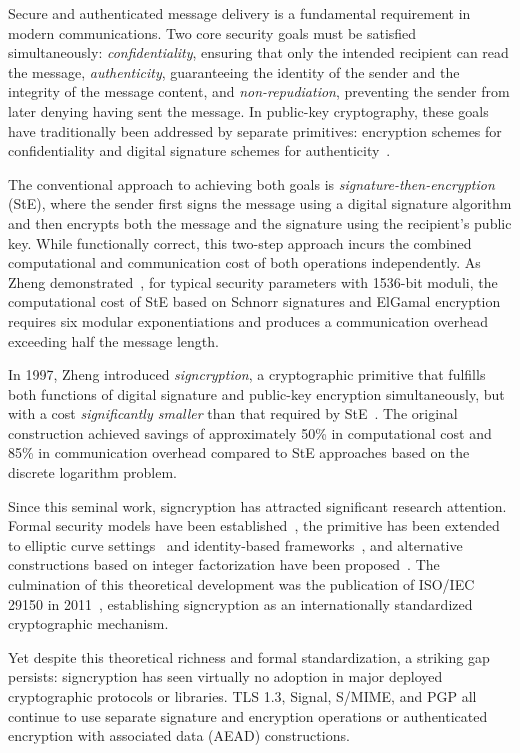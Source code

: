 \documentclass[conference]{IEEEtran}
\begin{document}
Secure and authenticated message delivery is a fundamental requirement in modern communications. Two core security goals must be satisfied simultaneously: \textit{confidentiality}, ensuring that only the intended recipient can read the message, \textit{authenticity}, guaranteeing the identity of the sender and the integrity of the message content, and \textit{non-repudiation}, preventing the sender from later denying having sent the message. In public-key cryptography, these goals have traditionally been addressed by separate primitives: encryption schemes for confidentiality and digital signature schemes for authenticity~\cite{zheng1997}.

The conventional approach to achieving both goals is \textit{signature-then-encryption} (StE), where the sender first signs the message using a digital signature algorithm and then encrypts both the message and the signature using the recipient's public key. While functionally correct, this two-step approach incurs the combined computational and communication cost of both operations independently. As Zheng demonstrated~\cite{zheng1997}, for typical security parameters with 1536-bit moduli, the computational cost of StE based on Schnorr signatures and ElGamal encryption requires six modular exponentiations and produces a communication overhead exceeding half the message length.

In 1997, Zheng introduced \textit{signcryption}, a cryptographic primitive that fulfills both functions of digital signature and public-key encryption simultaneously, but with a cost \textit{significantly smaller} than that required by StE~\cite{zheng1997}. The original construction achieved savings of approximately 50\% in computational cost and 85\% in communication overhead compared to StE approaches based on the discrete logarithm problem.

Since this seminal work, signcryption has attracted significant research attention. Formal security models have been established~\cite{baek2002, an2002, baek2007}, the primitive has been extended to elliptic curve settings~\cite{zheng1998} and identity-based frameworks~\cite{malonelee2002, boyen2003}, and alternative constructions based on integer factorization have been proposed~\cite{steinfeld2000}. The culmination of this theoretical development was the publication of ISO/IEC 29150 in 2011~\cite{iso29150}, establishing signcryption as an internationally standardized cryptographic mechanism.

Yet despite this theoretical richness and formal standardization, a striking gap persists: signcryption has seen virtually no adoption in major deployed cryptographic protocols or libraries. TLS 1.3, Signal, S/MIME, and PGP all continue to use separate signature and encryption operations or authenticated encryption with associated data (AEAD) constructions.
\end{document}
